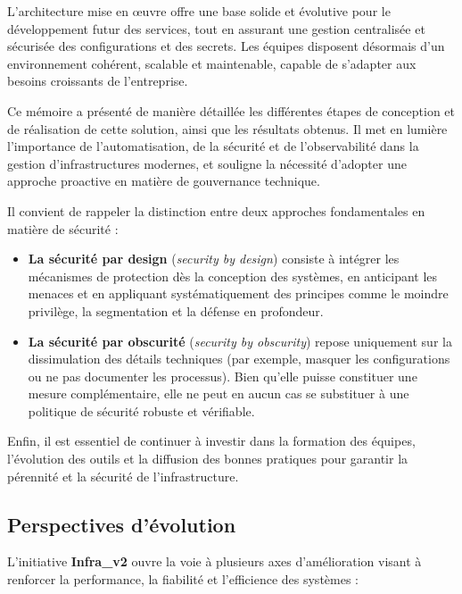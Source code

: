 L’architecture mise en œuvre offre une base solide et évolutive pour le développement futur des services, tout en assurant une gestion centralisée et sécurisée des configurations et des secrets. Les équipes disposent désormais d’un environnement cohérent, scalable et maintenable, capable de s’adapter aux besoins croissants de l’entreprise.

Ce mémoire a présenté de manière détaillée les différentes étapes de conception et de réalisation de cette solution, ainsi que les résultats obtenus. Il met en lumière l’importance de l’automatisation, de la sécurité et de l’observabilité dans la gestion d’infrastructures modernes, et souligne la nécessité d’adopter une approche proactive en matière de gouvernance technique.

Il convient de rappeler la distinction entre deux approches fondamentales en matière de sécurité :
\begin{itemize}
	\item \textbf{La sécurité par design} (\emph{security by design}) consiste à intégrer les mécanismes de protection dès la conception des systèmes, en anticipant les menaces et en appliquant systématiquement des principes comme le moindre privilège, la segmentation et la défense en profondeur.
	\item \textbf{La sécurité par obscurité} (\emph{security by obscurity}) repose uniquement sur la dissimulation des détails techniques (par exemple, masquer les configurations ou ne pas documenter les processus). Bien qu’elle puisse constituer une mesure complémentaire, elle ne peut en aucun cas se substituer à une politique de sécurité robuste et vérifiable.
\end{itemize}

Enfin, il est essentiel de continuer à investir dans la formation des équipes, l’évolution des outils et la diffusion des bonnes pratiques pour garantir la pérennité et la sécurité de l’infrastructure.

\subsection{Perspectives d’évolution}

L’initiative \textbf{Infra\_v2} ouvre la voie à plusieurs axes d’amélioration visant à renforcer la performance, la fiabilité et l’efficience des systèmes :

